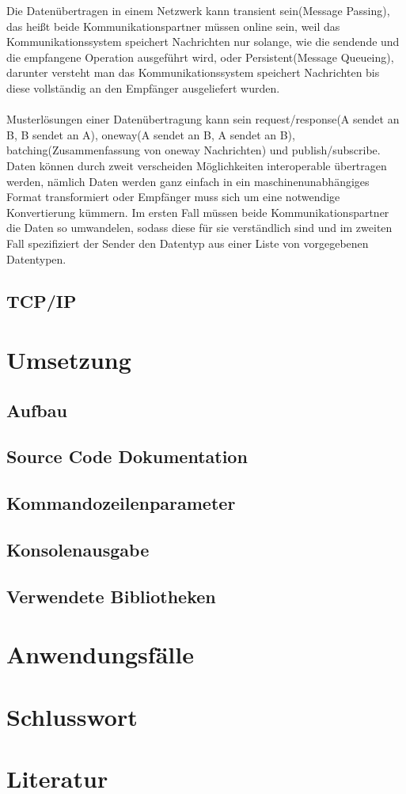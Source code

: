 \documentclass[a4paper,12pt]{article}
\begin{document}
Die Datenübertragen in einem Netzwerk kann transient sein(Message Passing), das heißt beide Kommunikationspartner müssen online sein, weil das Kommunikationssystem speichert Nachrichten nur solange, wie die
sendende und die empfangene Operation ausgeführt wird, oder Persistent(Message Queueing), darunter versteht man das Kommunikationssystem speichert Nachrichten bis diese vollständig an den Empfänger ausgeliefert wurden.\\\\
Musterlösungen einer Datenübertragung kann sein request/response(A sendet an B, B sendet an A), oneway(A sendet an B, A sendet an B), batching(Zusammenfassung von oneway Nachrichten) und publish/subscribe. Daten können durch zweit verscheiden Möglichkeiten interoperable übertragen werden, nämlich Daten werden ganz einfach in ein maschinenunabhängiges Format transformiert oder Empfänger muss sich um eine notwendige Konvertierung kümmern. Im ersten Fall müssen beide Kommunikationspartner
die Daten so umwandelen, sodass diese für sie verständlich sind und im zweiten Fall spezifiziert der Sender den Datentyp aus einer Liste von vorgegebenen Datentypen.
\subsection{TCP/IP}
\cite{socialMediaUse2020}



\section{Umsetzung}

\subsection{Aufbau}

\subsection{Source Code Dokumentation}

\subsection{Kommandozeilenparameter}

\subsection{Konsolenausgabe}


\subsection{Verwendete Bibliotheken}

\section{Anwendungsfälle}

\section{Schlusswort}

\section{Literatur}

\printbibliography
\end{document}
